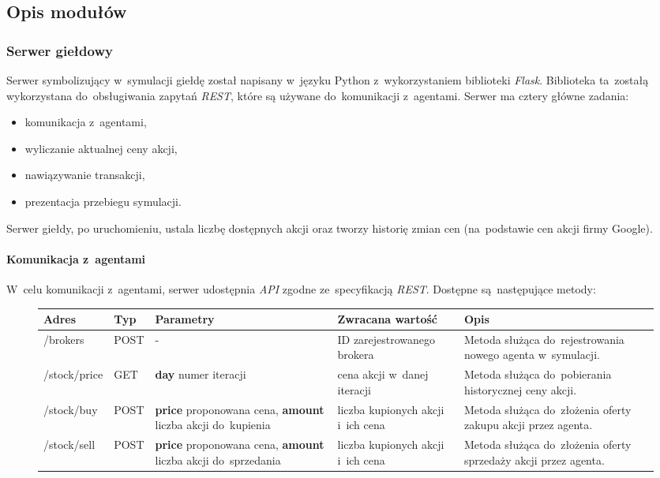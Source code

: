\documentclass[11pt,a4paper]{article}
\begin{document}
\subsection{Opis modułów}
\subsubsection{Serwer giełdowy}
Serwer symbolizujący w~symulacji giełdę został napisany w~języku Python z~wykorzystaniem
biblioteki \textit{Flask}. Biblioteka ta~zostałą wykorzystana do~obsługiwania zapytań \textit{REST}, które
są używane do~komunikacji z~agentami. Serwer ma cztery główne zadania:
\begin{multicols}{2}
  \begin{itemize}
    \item komunikacja z~agentami,
    \item wyliczanie aktualnej ceny akcji,
    \item nawiązywanie transakcji,
    \item prezentacja przebiegu symulacji.
  \end{itemize}
\end{multicols}

Serwer giełdy, po uruchomieniu, ustala liczbę dostępnych akcji oraz tworzy historię zmian cen (na~podstawie
cen akcji firmy Google).

\paragraph{Komunikacja z~agentami}
W~celu komunikacji z~agentami, serwer udostępnia \textit{API} zgodne ze~specyfikacją \textit{REST}. Dostępne
są następujące metody:
\begin{figure}[H]
  \begin{tabularx}{\textwidth}{ |p{2cm}|p{1cm}|p{5cm}|p{2.5cm}|X| }
    \hline \textbf{Adres} & \textbf{Typ} & \textbf{Parametry} & \textbf{Zwracana wartość} & \textbf{Opis} \\ \hline
    /brokers & POST & - & ID zarejestrowanego brokera & Metoda służąca do~rejestrowania nowego agenta w~symulacji. \\ \hline
    /stock/price & GET & \textbf{day} numer iteracji & cena akcji w~danej iteracji & Metoda służąca do~pobierania historycznej ceny akcji. \\ \hline
    /stock/buy & POST & \textbf{price} proponowana cena, \textbf{amount} liczba akcji do~kupienia & liczba kupionych akcji i~ich cena & Metoda służąca do~złożenia oferty zakupu akcji przez agenta. \\ \hline
    /stock/sell & POST & \textbf{price} proponowana cena, \textbf{amount} liczba akcji do~sprzedania & liczba kupionych akcji i~ich cena & Metoda służąca do~złożenia oferty sprzedaży akcji przez agenta. \\ \hline
  \end{tabularx}
\end{figure}
\end{document}
